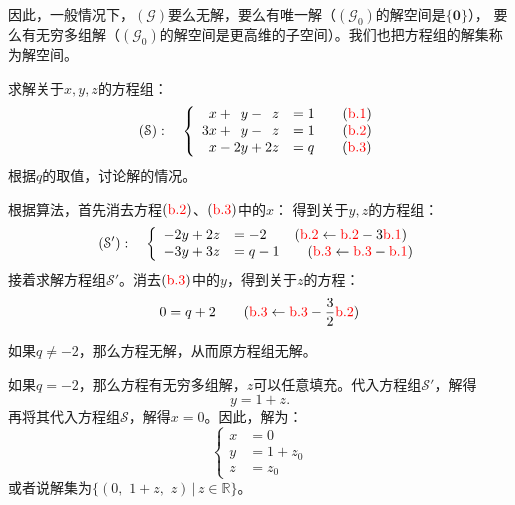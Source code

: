 \documentclass[12pt,UTF8,fontset=none]{ctexbook}
\begin{document}
因此，一般情况下，$(\mathcal{G})$要么无解，要么有唯一解（$(\mathcal{G}_0)$的解空间是$\{\mathbf{0}\}$），
要么有无穷多组解（$(\mathcal{G}_0)$的解空间是更高维的子空间）。我们也把方程组的解集称为解空间。

\begin{et}
    求解关于$x,y,z$的方程组：
    $$ (\mathcal{S}):\quad \left\{
        \begin{array}{rl}
            \phantom{0}x + \phantom{0}y - \phantom{0}z &= 1 \quad \quad ({\color{red}\mathrm{b}.1})\\
            3x + \phantom{0}y - \phantom{0}z &= 1  \quad \quad ({\color{red}\mathrm{b}.2}) \\
            \phantom{0}x - 2y  + 2z &= q  \quad \quad ({\color{red}\mathrm{b}.3}) \\
    \end{array}
    \right. $$
    根据$q$的取值，讨论解的情况。
    
\end{et}

\begin{so}
    根据算法，首先消去方程$({\color{red}\mathrm{b}.2})$、$({\color{red}\mathrm{b}.3})$中的$x$：
    得到关于$y,z$的方程组：
    $$ (\mathcal{S'}):\quad \left\{
        \begin{array}{rl}
            -2y + 2z &= -2  \quad \quad ({{\color{red}\mathrm{b}.2} \leftarrow {\color{red}\mathrm{b}.2} - 3\color{red}\mathrm{b}.1}) \\
            -3y  + 3z &= q - 1  \quad \quad ({{\color{red}\mathrm{b}.3} \leftarrow {\color{red}\mathrm{b}.3} - \color{red}\mathrm{b}.1})
    \end{array}
    \right. $$
    接着求解方程组$\mathcal{S'}$。消去$({\color{red}\mathrm{b}.3})$中的$y$，得到关于$z$的方程：
    $$ 0 = q + 2 \quad \quad ({{\color{red}\mathrm{b}.3} \leftarrow {\color{red}\mathrm{b}.3} - \frac{3}{2}\color{red}\mathrm{b}.2})$$
    
    如果$q \neq -2$，那么方程无解，从而原方程组无解。

    如果$q = -2$，那么方程有无穷多组解，$z$可以任意填充。代入方程组$\mathcal{S'}$，解得
    $$ y = 1 + z.$$
    再将其代入方程组$\mathcal{S}$，解得$x = 0$。因此，解为：
    $$ \left\{
    \begin{array}{rl}
    x &= 0 \\
    y &= 1 + z_0\\
    z &= z_0
    \end{array}
    \right. $$
    或者说解集为$\{(0, \,\,1 + z,\,\, z) \, | \, z\in \mathbb{R}\}$。

\end{so}
\end{document}
